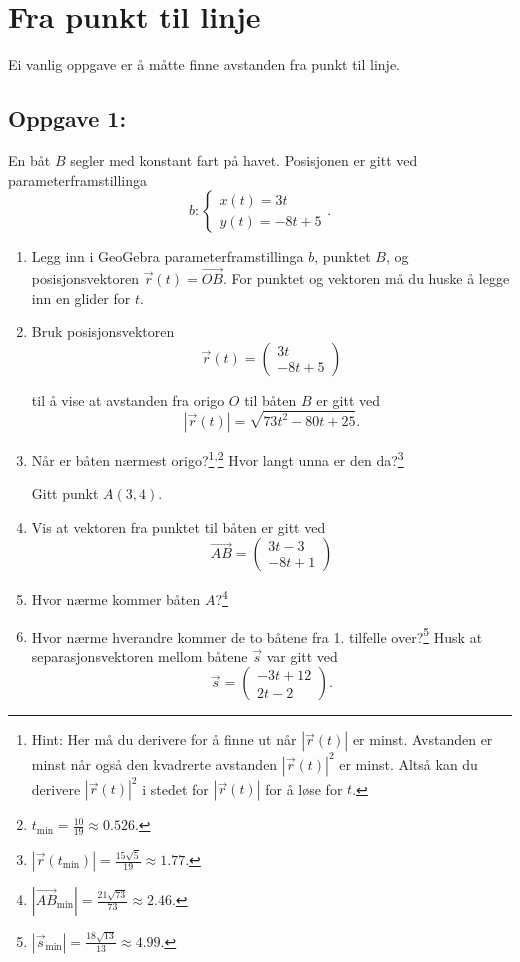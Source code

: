 \documentclass[a4paper,12pt]{article}
\begin{document}
\section*{Fra punkt til linje}

Ei vanlig oppgave er å måtte finne avstanden fra punkt til linje.

\subsection*{Oppgave 1:}

En båt $B$ segler med konstant fart på havet. Posisjonen er gitt ved parameterframstillinga
\[
b:
\begin{cases}
x(t)=3t \\
y(t)=-8t+5
\end{cases}.
\]

\begin{enumerate}[label=\alph*)]
\item Legg inn i GeoGebra parameterframstillinga $b$, punktet $B$, og posisjonsvektoren $\vec r(t) = \overrightarrow{OB}$. For punktet og vektoren må du huske å legge inn en glider for $t$.

\item Bruk posisjonsvektoren 
\[
\vec r(t)= 
\begin{pmatrix}
3t\\
-8t+5
\end{pmatrix}
\]

til å vise at avstanden fra origo $O$ til båten $B$ er gitt ved
\[
|\vec r(t)| = \sqrt{73t^2-80t +25}.
\]

\item Når er båten nærmest origo?\footnote{Hint: Her må du derivere for å finne ut når $|\vec r(t)|$ er minst. Avstanden er minst når også den kvadrerte avstanden $|\vec r(t)|^2$ er minst. Altså kan du derivere $|\vec r(t)|^2$ i stedet for $|\vec r(t)|$ for å løse for $t$.}\textsuperscript{,}\footnote{$t_{\text{min}}= \frac{10}{19} \approx 0.526$.} Hvor langt unna er den da?\footnote{$|\vec r(t_{\text{min}})| = \frac{15\sqrt 5}{19} \approx 1.77$.}

Gitt punkt $A(3,4)$.

\item Vis at vektoren fra punktet til båten er gitt ved \[
\overrightarrow{AB} = 
\begin{pmatrix}
3t-3\\
-8t+1
\end{pmatrix}
\]
\item Hvor nærme kommer båten $A$?\footnote{$|\overrightarrow{AB}_{\text{min}}| = \frac{21\sqrt{73}}{73} \approx 2.46.$}

\item Hvor nærme hverandre kommer de to båtene fra 1. tilfelle over?\footnote{$|\vec s_\text{min}| = \frac{18\sqrt{13}}{13} \approx 4.99.$} Husk at separasjonsvektoren mellom båtene $\vec s$ var gitt ved
\[
\vec s =
\begin{pmatrix}
-3t + 12 \\
2t -2
\end{pmatrix}.
\]

\end{enumerate}
\newpage
\end{document}
